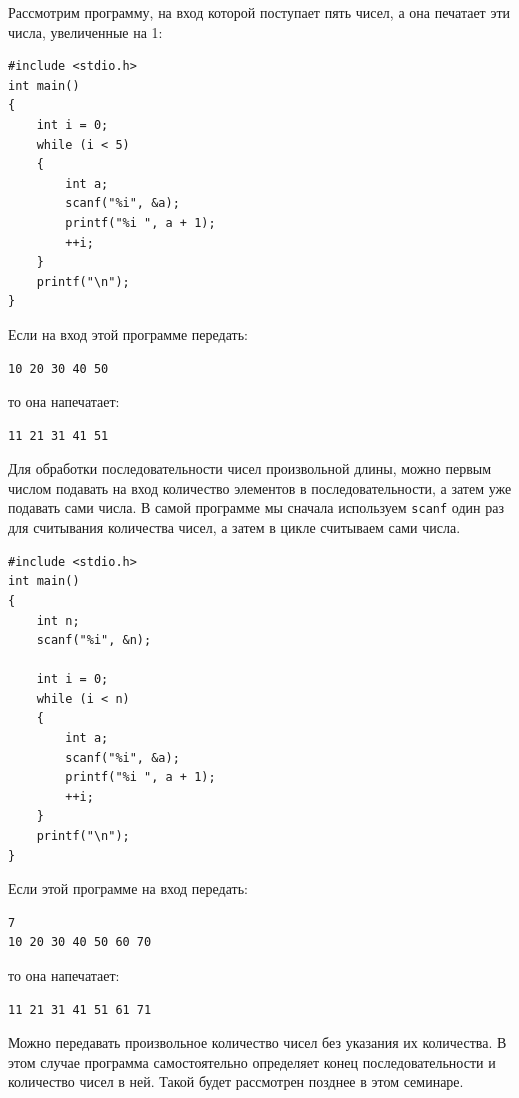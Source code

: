 \documentclass[10pt]{article}
\begin{document}
Рассмотрим программу, на вход которой поступает пять чисел, а она печатает эти числа, увеличенные на 1:
\begin{lstlisting}
#include <stdio.h>
int main()
{
    int i = 0;
    while (i < 5)
    {
        int a;
        scanf("%i", &a);
        printf("%i ", a + 1);
        ++i;
    }
    printf("\n");
}
\end{lstlisting}
Если на вход этой программе передать:
\begin{verbatim}
10 20 30 40 50
\end{verbatim}
то она напечатает:
\begin{verbatim}
11 21 31 41 51
\end{verbatim}

\noindent Для обработки последовательности чисел произвольной длины, можно первым числом подавать на вход количество элементов в последовательности, а затем уже подавать сами числа. В самой программе мы сначала используем \texttt{scanf} один раз для считывания количества чисел, а затем в цикле считываем сами числа.
\begin{lstlisting}
#include <stdio.h>
int main()
{
    int n;
    scanf("%i", &n);
    
    int i = 0;
    while (i < n)
    {
        int a;
        scanf("%i", &a);
        printf("%i ", a + 1);
        ++i;
    }
    printf("\n");
}
\end{lstlisting}
Если этой программе на вход передать:
\begin{verbatim}
7
10 20 30 40 50 60 70
\end{verbatim}
то она напечатает:
\begin{verbatim}
11 21 31 41 51 61 71
\end{verbatim}

\noindent Можно передавать произвольное количество чисел без указания их количества. В этом случае программа самостоятельно определяет конец последовательности и количество чисел в ней. Такой будет рассмотрен позднее в этом семинаре.
\end{document}

